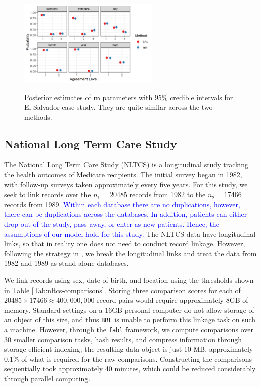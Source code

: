 \documentclass[ba]{imsart}
\begin{document}
	
	\begin{figure}[t]
		\begin{center}
			\includegraphics[width=0.6\textwidth]{../notes/figures/el_salvador/m_posterior_smallP} 
			\caption{Posterior estimates of $\bm{m}$ parameters with 95\% credible intervals for El Salvador case study. They are quite similar across the two methods.}\label{fig:m-and-u}
			\label{fig:m-and-u}
		\end{center}
	\end{figure}
	
	\subsection{National Long Term Care Study}
	\label{nltcs}
	
	The National Long Term Care Study (NLTCS) is a longitudinal study tracking the health outcomes of Medicare recipients. The initial survey began in 1982, with follow-up surveys taken approximately every five years. For this study, we seek to link records over the $n_1 = 20485$ records from 1982 to the $n_2 = 17466$ records from 1989. \textcolor{blue}{Within each database there are no duplications, however, there can be duplications across the databases. In addition, patients can either drop out of the study, pass away, or enter as new patients. Hence, the assumptions of our model hold for this study.}
	The NLTCS data have longitudinal links, so that in reality one does not need to conduct record linkage.  However, following the strategy in \cite{guha:reiter:BA}, we break the longitudinal links and treat the data from 1982 and 1989 as stand-alone databases.
	
	We link records using sex, date of birth, and location using the thresholds shown in Table \ref{Tab:nltcs-comparisons}. Storing three comparison scores for each of $20485 \times 17466 \approx 400,000,000$ record pairs would require approximately 8GB of memory. Standard settings on a 16GB personal computer do not allow storage of an object of this size, and thus \texttt{BRL} is unable to perform this linkage task on such a machine. However, through the \texttt{fabl} framework, we compute comparisons over 30 smaller comparison tasks, hash results, and compress information through storage efficient indexing; the resulting data object is just 10 MB, approximately 0.1\% of what is required for the raw comparisons. Constructing the comparisons sequentially took approximately 40 minutes, which could be reduced considerably through parallel computing. 
	
\end{document}
